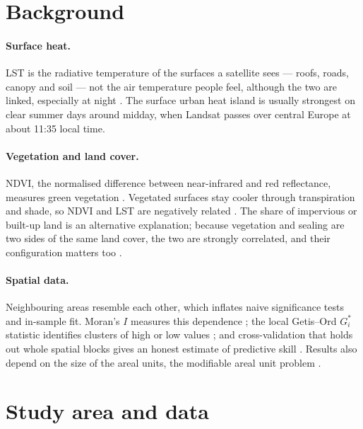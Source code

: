 \documentclass[11pt,a4paper]{article}
\begin{document}
\section{Background}

\paragraph{Surface heat.} LST is the radiative temperature of the surfaces a satellite sees --- roofs, roads, canopy and soil --- not the air temperature people feel, although the two are linked, especially at night \cite{voogt2003}. The surface urban heat island is usually strongest on clear summer days around midday, when Landsat passes over central Europe at about 11:35 local time.

\paragraph{Vegetation and land cover.} NDVI, the normalised difference between near-infrared and red reflectance, measures green vegetation \cite{rouse1974}. Vegetated surfaces stay cooler through transpiration and shade, so NDVI and LST are negatively related \cite{weng2004}. The share of impervious or built-up land is an alternative explanation; because vegetation and sealing are two sides of the same land cover, the two are strongly correlated, and their configuration matters too \cite{zhou2011}.

\paragraph{Spatial data.} Neighbouring areas resemble each other, which inflates naive significance tests and in-sample fit. Moran's $I$ measures this dependence \cite{moran1950}; the local Getis–Ord $G_i^*$ statistic identifies clusters of high or low values \cite{ord1995}; and cross-validation that holds out whole spatial blocks gives an honest estimate of predictive skill \cite{roberts2017}. Results also depend on the size of the areal units, the modifiable areal unit problem \cite{openshaw1984}.

\section{Study area and data}
\label{sec:data}
\end{document}
